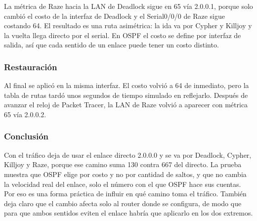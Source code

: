 
La métrica de Raze hacia la LAN de Deadlock sigue en 65 vía 2.0.0.1, porque  solo cambió el costo de la interfaz de Deadlock y el Serial0/0/0 de Raze sigue costando 64. El resultado es una ruta asimétrica: la ida va por Cypher y Killjoy y la vuelta llega directo por el serial. En OSPF el costo se define por interfaz de salida, así que cada sentido de un enlace puede tener un costo distinto.

\subsubsection*{Restauración}

Al final se aplicó  en la misma interfaz. El costo volvió a 64 de inmediato, pero la tabla de rutas tardó unos segundos de tiempo simulado en reflejarlo. Después de avanzar el reloj de Packet Tracer, la LAN de Raze volvió a aparecer con métrica 65 vía 2.0.0.2.

\subsubsection*{Conclusión}

Con  el tráfico deja de usar el enlace directo 2.0.0.0 y se va por Deadlock, Cypher, Killjoy y Raze, porque ese camino suma 130 contra 667 del directo. La prueba muestra que OSPF elige por costo y no por cantidad de saltos, y que  no cambia la velocidad real del enlace, solo el número con el que OSPF hace sus cuentas. Por eso es una forma práctica de influir en qué camino toma el tráfico. También deja claro que el cambio afecta solo al router donde se configura, de modo que para que ambos sentidos eviten el enlace habría que aplicarlo en los dos extremos.
